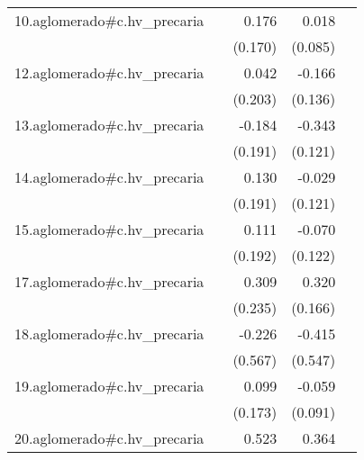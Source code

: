 {\begin{longtable}{l*{4}{D{.}{.}{-1}}}
\addlinespace
10.aglomerado#c.hv\_precaria&                     &       0.176         &       0.018         &                     \\
            &                     &     (0.170)         &     (0.085)         &                     \\
\addlinespace
12.aglomerado#c.hv\_precaria&                     &       0.042         &      -0.166         &                     \\
            &                     &     (0.203)         &     (0.136)         &                     \\
\addlinespace
13.aglomerado#c.hv\_precaria&                     &      -0.184         &      -0.343\sym{**} &                     \\
            &                     &     (0.191)         &     (0.121)         &                     \\
\addlinespace
14.aglomerado#c.hv\_precaria&                     &       0.130         &      -0.029         &                     \\
            &                     &     (0.191)         &     (0.121)         &                     \\
\addlinespace
15.aglomerado#c.hv\_precaria&                     &       0.111         &      -0.070         &                     \\
            &                     &     (0.192)         &     (0.122)         &                     \\
\addlinespace
17.aglomerado#c.hv\_precaria&                     &       0.309         &       0.320         &                     \\
            &                     &     (0.235)         &     (0.166)         &                     \\
\addlinespace
18.aglomerado#c.hv\_precaria&                     &      -0.226         &      -0.415         &                     \\
            &                     &     (0.567)         &     (0.547)         &                     \\
\addlinespace
19.aglomerado#c.hv\_precaria&                     &       0.099         &      -0.059         &                     \\
            &                     &     (0.173)         &     (0.091)         &                     \\
\addlinespace
20.aglomerado#c.hv\_precaria&                     &       0.523         &       0.364         &                     \\

\end{longtable}}
